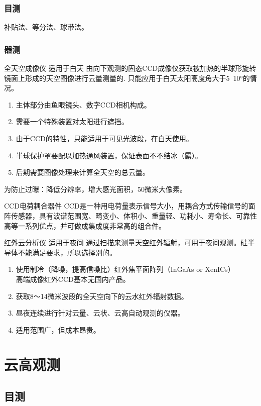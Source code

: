 \documentclass[UTF8,11pt]{ctexbook}
\begin{document}
\subsubsection{目测}

补贴法、等分法、球带法。

\subsubsection{器测}

全天空成像仪 适用于白天	 由向下观测的固态CCD成像仪获取被加热的半球形旋转镜面上形成的天空图像进行云量测量的. 只能应用于白天太阳高度角大于5~10°的情况。
\begin{enumerate}
    \item 主体部分由鱼眼镜头、数字CCD相机构成。
    \item 需要一个特殊装置对太阳进行遮挡。
    \item 由于CCD的特性，只能适用于可见光波段，在白天使用。
    \item 半球保护罩要配以加热通风装置，保证表面不不结冰（露）。
    \item 后期需要图像处理来计算全天空的总云量。
\end{enumerate}

为防止过曝：降低分辨率，增大感光面积，50微米大像素。

CCD电荷耦合器件 CCD是一种用电荷量表示信号大小，用耦合方式传输信号的面阵传感器，具有波谱范围宽、畸变小、体积小、重量轻、功耗小、寿命长、可靠性高等一系列优点，并可做成集成度非常高的组合件。

红外云分析仪 适用于夜间	通过扫描来测量天空红外辐射，可用于夜间观测。硅半导体不能满足要求，所以选择别的。
\begin{enumerate}
    \item 使用制冷（降噪，提高信噪比）红外焦平面阵列（InGaAs or XenICs）\\高端成像红外CCD基本无国内产品。
    \item 获取8～14微米波段的全天空向下的云水红外辐射数据。
    \item 昼夜连续进行针对云量、云状、云高自动观测的仪器。
    \item 适用范围广，但成本昂贵。
\end{enumerate}

\section{云高观测}

\subsection{目测}
\end{document}
